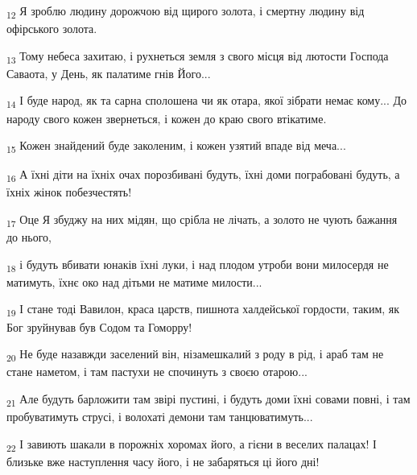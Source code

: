 \begin{tcolorbox}
\textsubscript{12} Я зроблю людину дорожчою від щирого золота, і смертну людину від офірського золота.
\end{tcolorbox}
\begin{tcolorbox}
\textsubscript{13} Тому небеса захитаю, і рухнеться земля з свого місця від лютости Господа Саваота, у День, як палатиме гнів Його...
\end{tcolorbox}
\begin{tcolorbox}
\textsubscript{14} І буде народ, як та сарна сполошена чи як отара, якої зібрати немає кому... До народу свого кожен звернеться, і кожен до краю свого втікатиме.
\end{tcolorbox}
\begin{tcolorbox}
\textsubscript{15} Кожен знайдений буде заколеним, і кожен узятий впаде від меча...
\end{tcolorbox}
\begin{tcolorbox}
\textsubscript{16} А їхні діти на їхніх очах порозбивані будуть, їхні доми пограбовані будуть, а їхніх жінок побезчестять!
\end{tcolorbox}
\begin{tcolorbox}
\textsubscript{17} Оце Я збуджу на них мідян, що срібла не лічать, а золото не чують бажання до нього,
\end{tcolorbox}
\begin{tcolorbox}
\textsubscript{18} і будуть вбивати юнаків їхні луки, і над плодом утроби вони милосердя не матимуть, їхнє око над дітьми не матиме милости...
\end{tcolorbox}
\begin{tcolorbox}
\textsubscript{19} І стане тоді Вавилон, краса царств, пишнота халдейської гордости, таким, як Бог зруйнував був Содом та Гоморру!
\end{tcolorbox}
\begin{tcolorbox}
\textsubscript{20} Не буде назавжди заселений він, нізамешкалий з роду в рід, і араб там не стане наметом, і там пастухи не спочинуть з своєю отарою...
\end{tcolorbox}
\begin{tcolorbox}
\textsubscript{21} Але будуть барложити там звірі пустині, і будуть доми їхні совами повні, і там пробуватимуть струсі, і волохаті демони там танцюватимуть...
\end{tcolorbox}
\begin{tcolorbox}
\textsubscript{22} І завиють шакали в порожніх хоромах його, а гієни в веселих палацах! І близьке вже наступлення часу його, і не забаряться ці його дні!
\end{tcolorbox}
